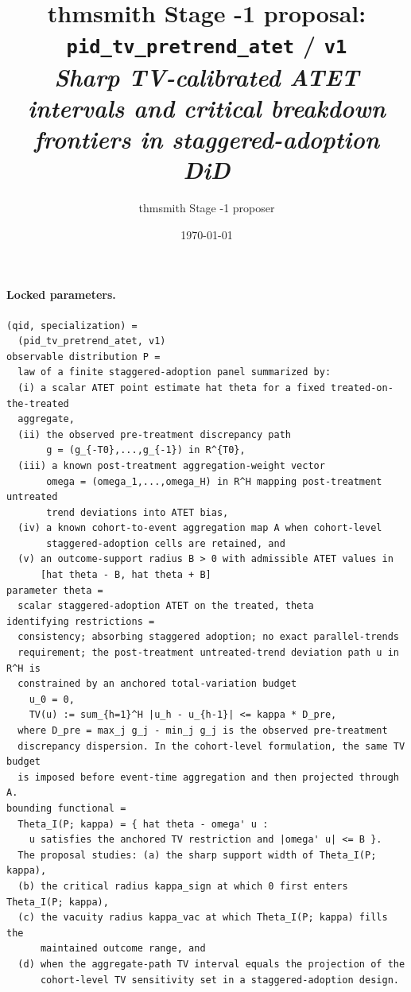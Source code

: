 \documentclass[11pt]{article}
\title{thmsmith Stage -1 proposal: \texttt{pid\_tv\_pretrend\_atet} / \texttt{v1}%
  \\ \large\textit{Sharp TV-calibrated ATET intervals and critical breakdown frontiers in staggered-adoption DiD}}
\author{thmsmith Stage -1 proposer}
\date{\today}
\theoremstyle{definition}
\theoremstyle{plain}
\theoremstyle{remark}
\begin{document}
\maketitle


\paragraph{Locked parameters.}
\begin{verbatim}
(qid, specialization) =
  (pid_tv_pretrend_atet, v1)
observable distribution P =
  law of a finite staggered-adoption panel summarized by:
  (i) a scalar ATET point estimate hat theta for a fixed treated-on-the-treated
  aggregate,
  (ii) the observed pre-treatment discrepancy path
       g = (g_{-T0},...,g_{-1}) in R^{T0},
  (iii) a known post-treatment aggregation-weight vector
       omega = (omega_1,...,omega_H) in R^H mapping post-treatment untreated
       trend deviations into ATET bias,
  (iv) a known cohort-to-event aggregation map A when cohort-level
       staggered-adoption cells are retained, and
  (v) an outcome-support radius B > 0 with admissible ATET values in
      [hat theta - B, hat theta + B]
parameter theta =
  scalar staggered-adoption ATET on the treated, theta
identifying restrictions =
  consistency; absorbing staggered adoption; no exact parallel-trends
  requirement; the post-treatment untreated-trend deviation path u in R^H is
  constrained by an anchored total-variation budget
    u_0 = 0,
    TV(u) := sum_{h=1}^H |u_h - u_{h-1}| <= kappa * D_pre,
  where D_pre = max_j g_j - min_j g_j is the observed pre-treatment
  discrepancy dispersion. In the cohort-level formulation, the same TV budget
  is imposed before event-time aggregation and then projected through A.
bounding functional =
  Theta_I(P; kappa) = { hat theta - omega' u :
    u satisfies the anchored TV restriction and |omega' u| <= B }.
  The proposal studies: (a) the sharp support width of Theta_I(P; kappa),
  (b) the critical radius kappa_sign at which 0 first enters Theta_I(P; kappa),
  (c) the vacuity radius kappa_vac at which Theta_I(P; kappa) fills the
      maintained outcome range, and
  (d) when the aggregate-path TV interval equals the projection of the
      cohort-level TV sensitivity set in a staggered-adoption design.
\end{verbatim}
\end{document}
